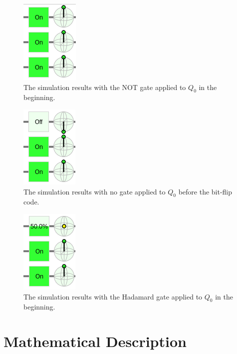 \documentclass{article}
\begin{document}
\begin{figure}[H]
    \centering
    \includegraphics[scale=0.6]{results1.png}
    \caption{The simulation results with the NOT gate applied to $Q_0$ in the beginning.}
    \label{fig:bitflipresults1}
\end{figure}

\begin{figure}[H]
    \centering
    \includegraphics[scale=0.6]{results2.png}
    \caption{The simulation results with no gate applied to $Q_0$ before the bit-flip code.}
    \label{fig:bitflipresults2}
\end{figure}

\begin{figure}[H]
    \centering
    \includegraphics[scale=0.6]{results3.png}
    \caption{The simulation results with the Hadamard gate applied to $Q_0$ in the beginning.}
    \label{fig:bitflipresults3}
\end{figure}

\section{Mathematical Description}
\end{document}
